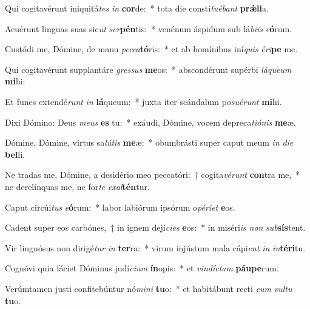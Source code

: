 \item Qui cogitavérunt iniquitá\textit{tes} \textit{in} \textbf{cor}de:~* tota die consti\textit{tu}\textit{é}\textit{bant} \textbf{prǽ}\textbf{li}a.
\item Acuérunt linguas suas sic\textit{ut} \textit{ser}\textbf{pén}tis:~* venénum áspidum sub lá\textit{bi}\textit{is} \textit{e}\textbf{ó}rum.
\item Custódi me, Dómine, de manu \textit{pec}\textit{ca}\textbf{tó}ris:~* et ab homínibus iní\textit{quis} \textit{é}\textit{ri}\textbf{pe} me.
\item Qui cogitavérunt supplantáre \textit{gres}\textit{sus} \textbf{me}os:~* abscondérunt supérbi \textit{lá}\textit{que}\textit{um} \textbf{mi}hi:
\item Et funes extendé\textit{runt} \textit{in} \textbf{lá}queum:~* juxta iter scándalum po\textit{su}\textit{é}\textit{runt} \textbf{mi}hi.
\item Dixi Dómino: Deus \textit{me}\textit{us} \textbf{es} tu:~* exáudi, Dómine, vocem depreca\textit{ti}\textit{ó}\textit{nis} \textbf{me}æ.
\item Dómine, Dómine, virtus sa\textit{lú}\textit{tis} \textbf{me}æ:~* obumbrásti super caput meum \textit{in} \textit{di}\textit{e} \textbf{bel}li.
\item Ne tradas me, Dómine, a desidério meo peccatóri:~† cogita\textit{vé}\textit{runt} \textbf{con}tra me,~* ne derelínquas me, ne for\textit{te} \textit{ex}\textit{al}\textbf{tén}tur.
\item Caput circúi\textit{tus} \textit{e}\textbf{ó}rum:~* labor labiórum ipsórum o\textit{pé}\textit{ri}\textit{et} \textbf{e}os.
\item Cadent super eos carbónes,~† in ignem dejí\textit{ci}\textit{es} \textbf{e}os:~* in miséri\textit{is} \textit{non} \textit{sub}\textbf{sís}tent.
\item Vir linguósus non dirigé\textit{tur} \textit{in} \textbf{ter}ra:~* virum injústum mala cápi\textit{ent} \textit{in} \textit{in}\textbf{tér}\textbf{i}tu.
\item Cognóvi quia fáciet Dóminus judí\textit{ci}\textit{um} \textbf{ín}opis:~* et \textit{vin}\textit{díc}\textit{tam} \textbf{páu}\textbf{pe}rum.
\item Verúmtamen justi confitebúntur nó\textit{mi}\textit{ni} \textbf{tu}o:~* et habitábunt recti \textit{cum} \textit{vul}\textit{tu} \textbf{tu}o.

